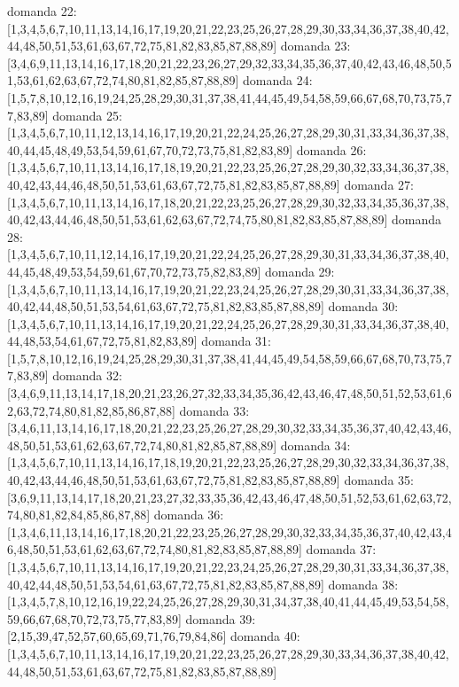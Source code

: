 domanda 22:[1,3,4,5,6,7,10,11,13,14,16,17,19,20,21,22,23,25,26,27,28,29,30,33,34,36,37,38,40,42,44,48,50,51,53,61,63,67,72,75,81,82,83,85,87,88,89]
domanda 23:[3,4,6,9,11,13,14,16,17,18,20,21,22,23,26,27,29,32,33,34,35,36,37,40,42,43,46,48,50,51,53,61,62,63,67,72,74,80,81,82,85,87,88,89]
domanda 24:[1,5,7,8,10,12,16,19,24,25,28,29,30,31,37,38,41,44,45,49,54,58,59,66,67,68,70,73,75,77,83,89]
domanda 25:[1,3,4,5,6,7,10,11,12,13,14,16,17,19,20,21,22,24,25,26,27,28,29,30,31,33,34,36,37,38,40,44,45,48,49,53,54,59,61,67,70,72,73,75,81,82,83,89]
domanda 26:[1,3,4,5,6,7,10,11,13,14,16,17,18,19,20,21,22,23,25,26,27,28,29,30,32,33,34,36,37,38,40,42,43,44,46,48,50,51,53,61,63,67,72,75,81,82,83,85,87,88,89]
domanda 27:[1,3,4,5,6,7,10,11,13,14,16,17,18,20,21,22,23,25,26,27,28,29,30,32,33,34,35,36,37,38,40,42,43,44,46,48,50,51,53,61,62,63,67,72,74,75,80,81,82,83,85,87,88,89]
domanda 28:[1,3,4,5,6,7,10,11,12,14,16,17,19,20,21,22,24,25,26,27,28,29,30,31,33,34,36,37,38,40,44,45,48,49,53,54,59,61,67,70,72,73,75,82,83,89]
domanda 29:[1,3,4,5,6,7,10,11,13,14,16,17,19,20,21,22,23,24,25,26,27,28,29,30,31,33,34,36,37,38,40,42,44,48,50,51,53,54,61,63,67,72,75,81,82,83,85,87,88,89]
domanda 30:[1,3,4,5,6,7,10,11,13,14,16,17,19,20,21,22,24,25,26,27,28,29,30,31,33,34,36,37,38,40,44,48,53,54,61,67,72,75,81,82,83,89]
domanda 31:[1,5,7,8,10,12,16,19,24,25,28,29,30,31,37,38,41,44,45,49,54,58,59,66,67,68,70,73,75,77,83,89]
domanda 32:[3,4,6,9,11,13,14,17,18,20,21,23,26,27,32,33,34,35,36,42,43,46,47,48,50,51,52,53,61,62,63,72,74,80,81,82,85,86,87,88]
domanda 33:[3,4,6,11,13,14,16,17,18,20,21,22,23,25,26,27,28,29,30,32,33,34,35,36,37,40,42,43,46,48,50,51,53,61,62,63,67,72,74,80,81,82,85,87,88,89]
domanda 34:[1,3,4,5,6,7,10,11,13,14,16,17,18,19,20,21,22,23,25,26,27,28,29,30,32,33,34,36,37,38,40,42,43,44,46,48,50,51,53,61,63,67,72,75,81,82,83,85,87,88,89]
domanda 35:[3,6,9,11,13,14,17,18,20,21,23,27,32,33,35,36,42,43,46,47,48,50,51,52,53,61,62,63,72,74,80,81,82,84,85,86,87,88]
domanda 36:[1,3,4,6,11,13,14,16,17,18,20,21,22,23,25,26,27,28,29,30,32,33,34,35,36,37,40,42,43,46,48,50,51,53,61,62,63,67,72,74,80,81,82,83,85,87,88,89]
domanda 37:[1,3,4,5,6,7,10,11,13,14,16,17,19,20,21,22,23,24,25,26,27,28,29,30,31,33,34,36,37,38,40,42,44,48,50,51,53,54,61,63,67,72,75,81,82,83,85,87,88,89]
domanda 38:[1,3,4,5,7,8,10,12,16,19,22,24,25,26,27,28,29,30,31,34,37,38,40,41,44,45,49,53,54,58,59,66,67,68,70,72,73,75,77,83,89]
domanda 39:[2,15,39,47,52,57,60,65,69,71,76,79,84,86]
domanda 40:[1,3,4,5,6,7,10,11,13,14,16,17,19,20,21,22,23,25,26,27,28,29,30,33,34,36,37,38,40,42,44,48,50,51,53,61,63,67,72,75,81,82,83,85,87,88,89]
